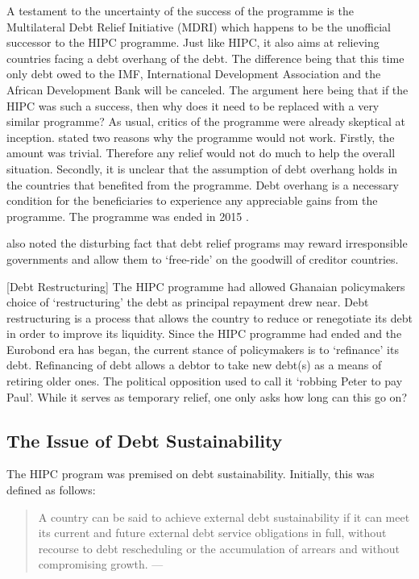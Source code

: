 \documentclass[12pt, a4paper]{article}
\begin{document}
	A testament to the uncertainty of the success of the programme is the Multilateral Debt Relief Initiative (MDRI) which happens to be the unofficial successor to the HIPC programme. Just like HIPC, it also aims at relieving countries facing a debt overhang of the debt. The difference being that this time only debt owed to the IMF, International Development Association and the African Development Bank will be canceled. The argument here being that if the HIPC was such a success, then why does it need to be replaced with a very similar programme? As usual, critics of the programme were already skeptical at inception.  stated two reasons why the programme would not work. Firstly, the amount was trivial. Therefore any relief would not do much to help the overall situation. Secondly, it is unclear that the assumption of debt overhang holds in the countries that benefited from the programme. Debt overhang is a necessary condition for the beneficiaries to experience any appreciable gains from the programme. The programme was ended in 2015 \cite{IMF2016}.
	
	 also noted the disturbing fact that debt relief programs may reward irresponsible governments and allow them to `free-ride' on the goodwill of creditor countries.
	
	[Debt Restructuring]
	The HIPC programme had allowed Ghanaian policymakers choice of `restructuring' the debt as principal repayment drew near. Debt restructuring is a process that allows the country to reduce or renegotiate its debt in order to improve its liquidity.  Since the HIPC programme had ended and the Eurobond era has began, the current stance of policymakers is to `refinance' its debt. Refinancing of debt allows a debtor to take new debt(s) as a means of retiring older ones. The political opposition used to call it `robbing Peter to pay Paul'. While it serves as temporary relief, one only asks how long can this go on? 
	
	\subsection{The Issue of Debt Sustainability}
	The HIPC program was premised on debt sustainability. Initially, this was defined as follows:
	
	\begin{quotation}
		A country can be said to achieve external debt sustainability if it can meet its current and future external debt service obligations in full, without recourse to debt rescheduling or the accumulation of arrears and without compromising growth.
		\hspace{1em plus 1fill}---\cite{THECHALLENGE}
	\end{quotation}
	
\end{document}
